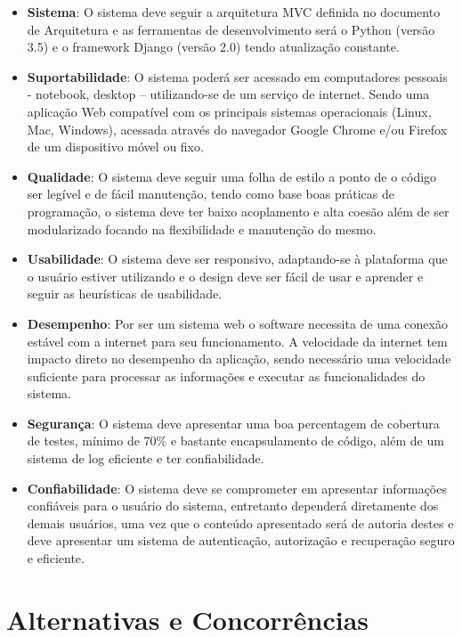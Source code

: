 \begin{itemize}
  \item \textbf{Sistema}: O sistema deve seguir a arquitetura MVC definida no documento de Arquitetura e as ferramentas
    de desenvolvimento será o Python (versão 3.5) e o framework Django (versão 2.0) tendo atualização constante.
  \item \textbf{Suportabilidade}: O sistema poderá ser acessado em computadores pessoais - notebook, desktop – utilizando-se de um serviço de internet. Sendo uma aplicação Web compatível com os principais sistemas operacionais (Linux, Mac, Windows), acessada através do navegador Google Chrome e/ou Firefox de um dispositivo móvel ou fixo.
  \item \textbf{Qualidade}: O sistema deve seguir uma folha de estilo a ponto de o código ser legível e de fácil manutenção, tendo como base boas práticas de programação, o sistema deve ter baixo acoplamento e alta coesão além de ser modularizado focando na flexibilidade e manutenção do mesmo.
  \item \textbf{Usabilidade}: O sistema deve ser responsivo, adaptando-se à plataforma que o usuário estiver utilizando e o design deve ser fácil de usar e aprender e seguir as heurísticas de usabilidade.
  \item \textbf{Desempenho}: Por ser um sistema web o software necessita de uma conexão estável com a internet para seu funcionamento. A velocidade da internet tem impacto direto no desempenho da aplicação, sendo necessário uma velocidade suficiente para processar as informações e executar as funcionalidades do sistema.
  \item \textbf{Segurança}: O sistema deve apresentar uma boa percentagem de cobertura de testes, mínimo de 70\% e bastante encapsulamento de código, além de um sistema de log eficiente e ter confiabilidade.
  \item \textbf{Confiabilidade}: O sistema deve se comprometer em apresentar informações confiáveis para o usuário do sistema, entretanto dependerá diretamente dos demais usuários, uma vez que o conteúdo apresentado será de autoria destes e deve apresentar um sistema de autenticação, autorização e recuperação seguro e eficiente.
\end{itemize}

\section{Alternativas e Concorrências}

